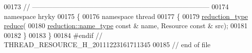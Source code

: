 \begin{DoxyCode}
00173 \textcolor{comment}{//
      ------------------------------------------------------------------------------}
00174 \textcolor{keyword}{namespace }hryky
00175 \{
00176 \textcolor{keyword}{namespace }thread
00177 \{
00179     \hyperlink{namespacehryky_a343a9a4c36a586be5c2693156200eadc}{reduction_type} \hyperlink{namespacehryky_1_1thread_aed5a09e1236726d3b2a02cff74f53524}{reduce}(
00180         \hyperlink{namespacehryky_1_1reduction_ac686c30a4c8d196bbd0f05629a6b921f}{reduction::name_type} \textcolor{keyword}{const} & name, Resource \textcolor{keyword}{const} & src);
00181 
00182 \}
00183 \}
00184 \textcolor{preprocessor}{#endif // THREAD\_RESOURCE\_H\_20111223161711345}
00185 \textcolor{preprocessor}{}\textcolor{comment}{// end of file}
\end{DoxyCode}
